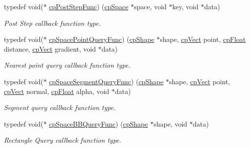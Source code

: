 \begin{DoxyCompactItemize}
\mbox{\label{group__cp_space_ga93e9005e387fec86eeb4a225ac295a23}} 
typedef void($\ast$ \mbox{\hyperlink{group__cp_space_ga93e9005e387fec86eeb4a225ac295a23}{cp\+Post\+Step\+Func}}) (\mbox{\hyperlink{structcp_space}{cp\+Space}} $\ast$space, void $\ast$key, void $\ast$data)
\begin{DoxyCompactList}\small\item\em Post Step callback function type. \end{DoxyCompactList}\item 
\mbox{\label{group__cp_space_ga646a55f0937f07c19b24561ed5341221}} 
typedef void($\ast$ \mbox{\hyperlink{group__cp_space_ga646a55f0937f07c19b24561ed5341221}{cp\+Space\+Point\+Query\+Func}}) (\mbox{\hyperlink{structcp_shape}{cp\+Shape}} $\ast$shape, \mbox{\hyperlink{structcp_vect}{cp\+Vect}} point, \mbox{\hyperlink{group__basic_types_gac1ed65573e035bf892505768c852d8d3}{cp\+Float}} distance, \mbox{\hyperlink{structcp_vect}{cp\+Vect}} gradient, void $\ast$data)
\begin{DoxyCompactList}\small\item\em Nearest point query callback function type. \end{DoxyCompactList}\item 
\mbox{\label{group__cp_space_ga9046beaeba5728c5e954f0f1dc2ae130}} 
typedef void($\ast$ \mbox{\hyperlink{group__cp_space_ga9046beaeba5728c5e954f0f1dc2ae130}{cp\+Space\+Segment\+Query\+Func}}) (\mbox{\hyperlink{structcp_shape}{cp\+Shape}} $\ast$shape, \mbox{\hyperlink{structcp_vect}{cp\+Vect}} point, \mbox{\hyperlink{structcp_vect}{cp\+Vect}} normal, \mbox{\hyperlink{group__basic_types_gac1ed65573e035bf892505768c852d8d3}{cp\+Float}} alpha, void $\ast$data)
\begin{DoxyCompactList}\small\item\em Segment query callback function type. \end{DoxyCompactList}\item 
\mbox{\label{group__cp_space_ga02779238e9b8c07797aae6139fad203c}} 
typedef void($\ast$ \mbox{\hyperlink{group__cp_space_ga02779238e9b8c07797aae6139fad203c}{cp\+Space\+B\+B\+Query\+Func}}) (\mbox{\hyperlink{structcp_shape}{cp\+Shape}} $\ast$shape, void $\ast$data)
\begin{DoxyCompactList}\small\item\em Rectangle Query callback function type. \end{DoxyCompactList}\item 

\end{DoxyCompactItemize}
